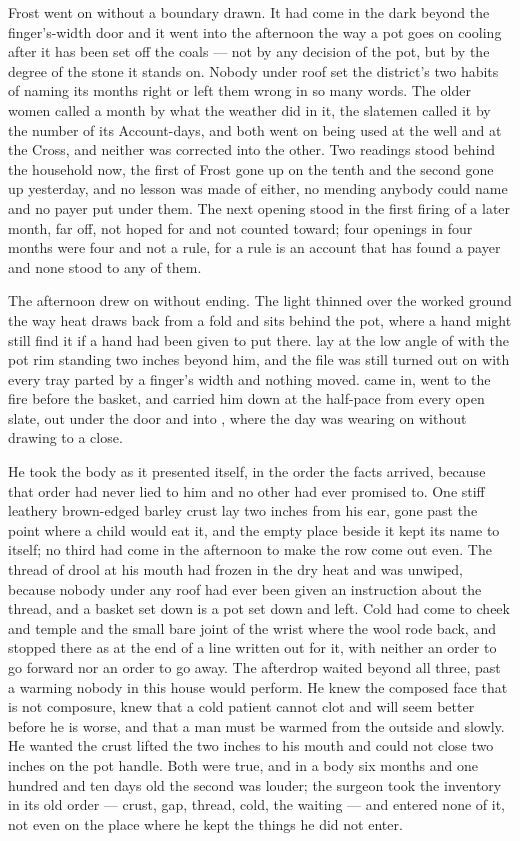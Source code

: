 Frost went on without a boundary drawn. It had come in the dark beyond the finger's-width door and it went into the afternoon the way a pot goes on cooling after it has been set off the coals --- not by any decision of the pot, but by the degree of the stone it stands on. Nobody under  roof set the district's two habits of naming its months right or left them wrong in so many words. The older women called a month by what the weather did in it, the slatemen called it by the number of its Account-days, and both went on being used at the well and at the Cross, and neither was corrected into the other. Two readings stood behind the household now, the first of Frost gone up on the tenth and the second gone up yesterday, and no lesson was made of either, no mending anybody could name and no payer put under them. The next opening stood in the first firing of a later month, far off, not hoped for and not counted toward; four openings in four months were four and not a rule, for a rule is an account that has found a payer and none stood to any of them.

The afternoon drew on without ending. The light thinned over the worked ground the way heat draws back from a fold and sits behind the pot, where a hand might still find it if a hand had been given to put there.  lay at the low angle of  with the pot rim standing two inches beyond him, and the file was still turned out on  with every tray parted by a finger's width and nothing moved.  came in, went to the fire before the basket, and carried him down at the half-pace from every open slate, out under the door and into , where the day was wearing on without drawing to a close.

He took the body as it presented itself, in the order the facts arrived, because that order had never lied to him and no other had ever promised to. One stiff leathery brown-edged barley crust lay two inches from his ear, gone past the point where a child would eat it, and the empty place beside it kept its name to itself; no third had come in the afternoon to make the row come out even. The thread of drool at his mouth had frozen in the dry heat and was unwiped, because nobody under any roof had ever been given an instruction about the thread, and a basket set down is a pot set down and left. Cold had come to cheek and temple and the small bare joint of the wrist where the wool rode back, and stopped there as at the end of a line written out for it, with neither an order to go forward nor an order to go away. The afterdrop waited beyond all three, past a warming nobody in this house would perform. He knew the composed face that is not composure, knew that a cold patient cannot clot and will seem better before he is worse, and that a man must be warmed from the outside and slowly. He wanted the crust lifted the two inches to his mouth and could not close two inches on the pot handle. Both were true, and in a body six months and one hundred and ten days old the second was louder; the surgeon took the inventory in its old order --- crust, gap, thread, cold, the waiting --- and entered none of it, not even on the place where he kept the things he did not enter.

